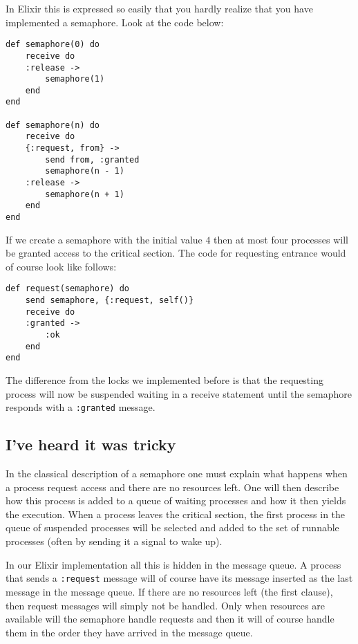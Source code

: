 \documentclass[a4paper,11pt]{article}
\begin{document}
In Elixir this is expressed so easily that you hardly realize that you
have implemented a semaphore. Look at the code below:

\begin{verbatim}
def semaphore(0) do
    receive do
    :release ->
        semaphore(1)
    end
end

def semaphore(n) do
    receive do
    {:request, from} ->
        send from, :granted
        semaphore(n - 1)
    :release ->
        semaphore(n + 1)
    end
end
\end{verbatim}

If we create a semaphore with the initial value $4$
then at most four processes will be granted access to the critical
section. The code for requesting entrance would of course look like follows:

\begin{verbatim}
def request(semaphore) do
    send semaphore, {:request, self()}
    receive do
    :granted ->
        :ok
    end
end
\end{verbatim}

The difference from the locks we implemented before is that the
requesting process will now be suspended waiting in a receive
statement until the semaphore responds with a {\tt :granted} message.


\subsection{I've heard it was tricky}

In the classical description of a semaphore one must explain what
happens when a process request access and there are no resources
left. One will then describe how this process is added to a queue of
waiting processes and how it then yields the execution. When a process
leaves the critical section, the first process in the queue of
suspended processes will be selected and added to the set of runnable
processes (often by sending it a signal to wake up).

In our Elixir implementation all this is hidden in the message
queue. A process that sends a {\tt :request} message will of course
have its message inserted as the last message in the message queue. If
there are no resources left (the first clause), then request messages
will simply not be handled. Only when resources are available will the
semaphore handle requests and then it will of course handle them in the
order they have arrived in the message queue.
\end{document}
